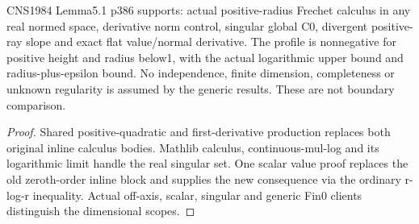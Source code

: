 \begin{lemma}
  \label{lem:log-radial-calculus}
  \leanok
  CNS1984 Lemma5.1 p386 supports: actual positive-radius Frechet calculus
  in any real normed space, derivative norm control, singular global C0,
  divergent positive-ray slope and exact flat value/normal derivative.
  The profile is nonnegative for positive height and radius below1, with
  the actual logarithmic upper bound and radius-plus-epsilon bound.
  No independence, finite dimension, completeness or unknown regularity
  is assumed by the generic results. These are not boundary comparison.
\end{lemma}
\begin{proof}
  \leanok
  Shared positive-quadratic and first-derivative production replaces both
  original inline calculus bodies. Mathlib calculus, continuous-mul-log
  and its logarithmic limit handle the real singular set. One scalar value
  proof replaces the old zeroth-order inline block and supplies the new
  consequence via the ordinary r-log-r inequality. Actual off-axis, scalar,
  singular and generic Fin0 clients distinguish the dimensional scopes.
\end{proof}

